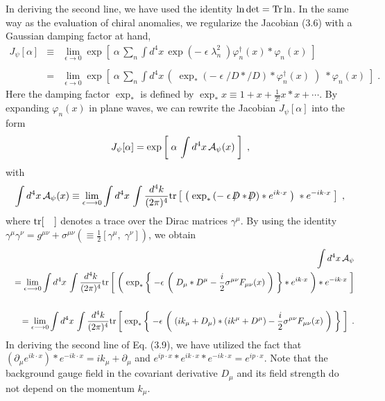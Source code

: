 \documentclass[a4paper,12pt]{article}
\begin{document}
%
In deriving the second line, we have used the identity $\ln \det 
= {\rm Tr} \ln$. In the same way as the evaluation of chiral anomalies, we 
regularize the Jacobian (3.6) with a Gaussian damping factor at hand, 
%
%
\begin{eqnarray}
J_{\psi}[\alpha] &\equiv& \lim_{\epsilon \longrightarrow 0}
\exp \left[\; \alpha \,\sum_{n} \int d^{4}x \,
\exp \left( -\;\epsilon \;\lambda_{n}^{2} \;\right) 
\varphi_{n}^{\dagger}(x) \ast \varphi_{n}(x)  \; \right] \nonumber \\
 & & \\
\!\!&=&\!\! \lim_{\epsilon \longrightarrow 0}
\exp \left[\; \alpha \,\sum_{n} \int d^{4}x \, 
\left( \;
\exp_{\ast} \left(-\; \epsilon\; /\!\!\!\!D \ast /\!\!\!\!D \right) \ast 
\varphi_{n}^{\dagger}(x) \; \right) \;
\ast \varphi_{n}(x)  \; \right] \nonumber  \;.
\end{eqnarray}
%
Here the damping factor $\exp_{\ast}$ is defined by $\exp_{\ast}x \equiv 
1+x+\frac{1}{2!}x \ast x + \cdots $. By expanding $\varphi_{n}(x)$ in plane 
waves, we can rewrite the Jacobian 
$J_{\psi}[\alpha]$ into the form 
%
%
\begin{eqnarray}
J_{\psi}[\alpha] = \exp \left[\; \alpha \,\int d^{4}x \,{\cal A}_{\psi}(x) 
\; \right] 
\nonumber \;,
\end{eqnarray}
%
%
with 
%
%
\begin{eqnarray}
\int d^{4}x \, {\cal A}_{\psi}(x) \equiv \lim_{\epsilon \longrightarrow 0}
\int d^{4}x \, \int \frac{d^{4}k}{(2\pi)^{4}} {\rm tr} \left[\;
\left( \;
\exp_{\ast}\left(-\; \epsilon\; /\!\!\!\!D \ast /\!\!\!\!D \right) \ast 
e^{ik \cdot x} \; \right) \; \ast e^{-ik \cdot x} \; \right]  \;,
\end{eqnarray}
%
where ${\rm tr}[ \quad ]$ denotes a trace over the Dirac matrices 
$\gamma^{\mu}$.  By using the identity $\gamma^{\mu}\gamma^{\nu} = 
g^{\mu\nu}+\sigma^{\mu\nu}(\equiv \frac{1}{2}[\gamma^{\mu}, 
\;\gamma^{\nu} ] )$, we obtain 
%
%
\begin{eqnarray}
& & \int d^{4}x \, {\cal A}_{\psi} \nonumber \\
& & = \lim_{\epsilon \longrightarrow 0}
\int d^{4}x \, \int \frac{d^{4}k}{(2\pi)^{4}} {\rm tr} \left[\; 
\left( \; 
\exp_{\ast}\left\{ \;-\epsilon \,\left( \; D_{\mu} \ast D^{\mu} - 
\frac{i}{2}\sigma^{\mu\nu}F_{\mu\nu}(x) \; \right) \;\right\} 
\ast e^{ik \cdot x} \;\right) \ast e^{-ik \cdot x} \; \right] \nonumber \\
 & &  \\
& & = \lim_{\epsilon \longrightarrow 0} \int d^{4}x \,
\int \frac{d^{4}k}{(2\pi)^{4}} {\rm tr} \left[\; 
\exp_{\ast}\left\{ \;-\epsilon \,\left( \; (ik_{\mu}+D_{\mu}) \ast 
(ik^{\mu}+D^{\mu}) 
- \frac{i}{2}\sigma^{\mu\nu}F_{\mu\nu}(x) \; \right) \;\right\} 
\; \right]  \;. \nonumber 
\end{eqnarray}
%
In deriving the second line of Eq. (3.9), we have utilized the fact that 
$(\partial_{\mu} e^{ik \cdot x}) \ast e^{-ik \cdot x} = ik_{\mu} 
+ \partial_{\mu}$ and $e^{ip \cdot x} \ast e^{ik \cdot x} \ast e^{-ik \cdot x} 
= e^{ip \cdot x}$. Note that the background gauge field in the covariant 
derivative $D_{\mu}$ and its field strength do not depend on the 
momentum $k_{\mu}$. 
\end{document}

